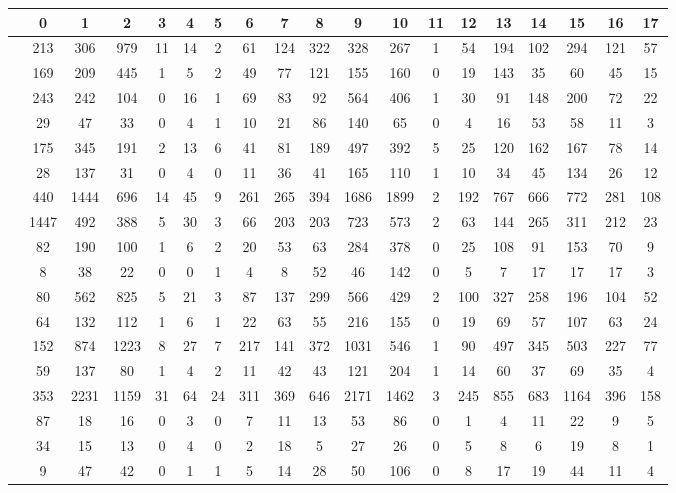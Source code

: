 \documentclass[german,version-2020-11]{uzl-thesis}
\begin{document}
\begin{enumerate}
\begin{center}
\begin{tabular}{ccccccccccccccccccc}
\hline
\hline 
&0&1&2&3&4&5&6&7&8&9&10&11&12&13&14&15&16&17\\
\hline
&213& 306& 979& 11& 14& 2& 61& 124& 322& 328& 267& 1& 54& 194& 102& 294& 121& 57\\
\hline
& 169& 209& 445& 1& 5& 2& 49& 77& 121& 155& 160& 0& 19& 143& 35& 60& 45& 15\\\hline
& 243& 242& 104& 0& 16& 1& 69& 83& 92& 564& 406& 1& 30& 91& 148& 200& 72& 22\\\hline
& 29& 47& 33& 0& 4& 1& 10& 21& 86& 140& 65& 0& 4& 16& 53& 58& 11& 3\\
\hline
& 175& 345& 191& 2& 13& 6& 41& 81& 189& 497& 392& 5& 25& 120& 162& 167& 78& 14\\\hline
& 28& 137& 31& 0& 4& 0& 11& 36& 41& 165& 110& 1& 10& 34& 45& 134& 26& 12\\
\hline
& 440& 1444& 696& 14& 45& 9& 261& 265& 394& 1686& 1899& 2& 192& 767& 666& 772& 281& 108\\
\hline
&1447& 492& 388& 5& 30& 3& 66& 203& 203& 723& 573& 2& 63& 144& 265& 311& 212& 23\\
\hline
& 82& 190& 100& 1& 6& 2& 20& 53& 63& 284& 378& 0& 25& 108& 91& 153& 70& 9\\
\hline
& 8& 38& 22& 0& 0& 1& 4& 8& 52& 46& 142& 0& 5& 7& 17& 17& 17& 3\\
\hline
& 80& 562& 825& 5& 21& 3& 87& 137& 299& 566& 429& 2& 100& 327& 258& 196& 104& 52\\
\hline
& 64& 132& 112& 1& 6& 1& 22& 63& 55& 216& 155& 0& 19& 69& 57& 107& 63& 24\\
\hline
& 152& 874& 1223& 8& 27& 7& 217& 141& 372& 1031& 546& 1& 90& 497& 345& 503& 227& 77\\
\hline
& 59& 137& 80& 1& 4& 2& 11& 42& 43& 121& 204& 1& 14& 60& 37& 69& 35& 4\\
\hline
& 353& 2231& 1159& 31& 64& 24& 311& 369& 646& 2171& 1462& 3& 245& 855& 683& 1164& 396& 158\\
\hline
& 87& 18& 16& 0& 3& 0& 7& 11& 13& 53& 86& 0& 1& 4& 11& 22& 9& 5\\
\hline
& 34& 15& 13& 0& 4& 0& 2& 18& 5& 27& 26& 0& 5& 8& 6& 19& 8& 1\\
\hline
& 9& 47& 42& 0& 1& 1& 5& 14& 28& 50& 106& 0& 8& 17& 19& 44& 11& 4\\
\hline
\hline
\end{tabular}
\end{center}\\


\end{enumerate}
\end{document}
